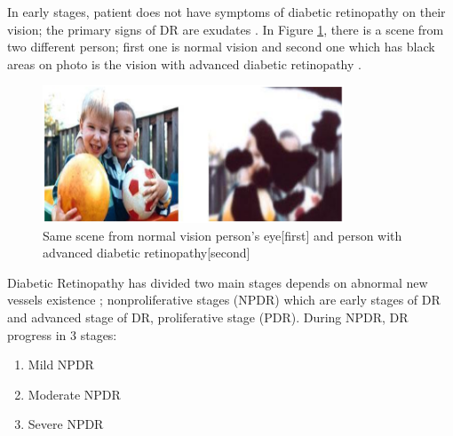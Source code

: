 In early stages, patient does not have symptoms of diabetic retinopathy on their vision; the primary signs of DR are exudates \citep{nijalingappa2015machine}. In Figure \ref{visionOfDrAndNodr}, there is a scene from two different person; first one is normal vision and second one which has black areas on photo is the vision with advanced diabetic retinopathy \citep{NationalEyeInstitute}. 

\begin{figure}[t]
\caption{Same scene from normal vision person's eye[first] and person with advanced diabetic retinopathy[second]}
\label{visionOfDrAndNodr}
\centering
\includegraphics[width=0.8\textwidth]{Figures/vision_of_dr_and_nodr}
\end{figure}

Diabetic Retinopathy has divided two main stages depends on abnormal new vessels existence  \citep{tang2011inflammation, nijalingappa2015machine}; nonproliferative stages (NPDR) which are early stages of DR and advanced stage of DR, proliferative stage (PDR). 
During NPDR, DR progress in 3 stages:

    \begin{enumerate}
        \item Mild NPDR
        \item Moderate NPDR
        \item Severe NPDR
    \end{enumerate}


